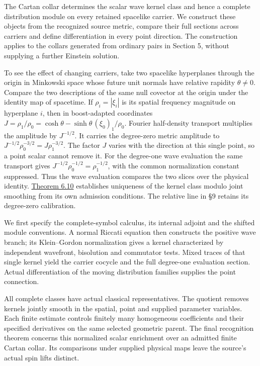 \documentclass[
  english,
  11pt,
  reqno]{amsart}
\begin{document}
The Cartan collar determines the scalar wave kernel class and hence a
complete distribution module on every retained spacelike carrier. We
construct these objects from the recognized source metric, compare their
full sections across carriers and define differentiation in every point
direction. The construction applies to the collars generated from
ordinary pairs in Section 5, without supplying a further Einstein
solution.

To see the effect of changing carriers, take two spacelike hyperplanes
through the origin in Minkowski space whose future unit normals have
relative rapidity \(\theta\ne0\). Compare the two descriptions of the
same null covector at the origin under the identity map of spacetime. If
\(\rho_i=|\xi_i|\) is its spatial frequency magnitude on hyperplane
\(i\), then in boost-adapted coordinates
\(J=\rho_1/\rho_0=\cosh\theta-\sinh\theta\,(\xi_0)_1/\rho_0\). Fourier
half-density transport multiplies the amplitude by \(J^{-1/2}\). It
carries the degree-zero metric amplitude to
\(J^{-1/2}\rho_0^{-3/2}=J\rho_1^{-3/2}\). The factor \(J\) varies with
the direction at this single point, so a point scalar cannot remove it.
For the degree-one wave evaluation the same transport gives
\(J^{-1/2}\rho_0^{-1/2}=\rho_1^{-1/2}\), with the common normalization
constant suppressed. Thus the wave evaluation compares the two slices
over the physical identity.
\hyperref[thm:online-canonical-wave-kernel]{Theorem 6.10} establishes
uniqueness of the kernel class modulo joint smoothing from its own
admission conditions. The relative line in §9 retains its degree-zero
calibration.

We first specify the complete-symbol calculus, its internal adjoint and
the shifted module conventions. A normal Riccati equation then
constructs the positive wave branch; its Klein--Gordon normalization
gives a kernel characterized by independent wavefront, bisolution and
commutator tests. Mixed traces of that single kernel yield the carrier
cocycle and the full degree-one evaluation section. Actual
differentiation of the moving distribution families supplies the point
connection.

All complete classes have actual classical representatives. The quotient
removes kernels jointly smooth in the spatial, point and supplied
parameter variables. Each finite estimate controls finitely many
homogeneous coefficients and their specified derivatives on the same
selected geometric parent. The final recognition theorem concerns this
normalized scalar enrichment over an admitted finite Cartan collar. Its
comparisons under supplied physical maps leave the source's actual spin
lifts distinct.
\end{document}
